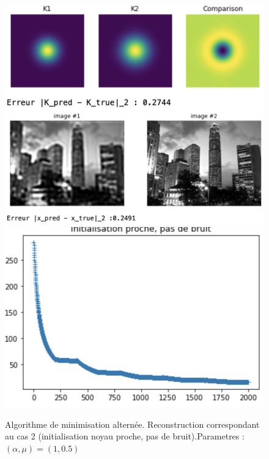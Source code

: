 \documentclass[a4paper]{article}
\begin{document}
\begin{figure}[h]
\includegraphics[scale=0.8]{figures/altrn-cas2-kernel}
\includegraphics[scale=0.6]{figures/altrn-cas2-image}
\includegraphics[scale=0.6]{figures/altrn-cas2-energy}
\caption{Algorithme de minimisation alternée. Reconstruction correspondant au cas 2  (initialisation noyau proche, pas de bruit).Parametres : $(\alpha,\mu) =(1,0.5)$}
\end{figure}
\end{document}

